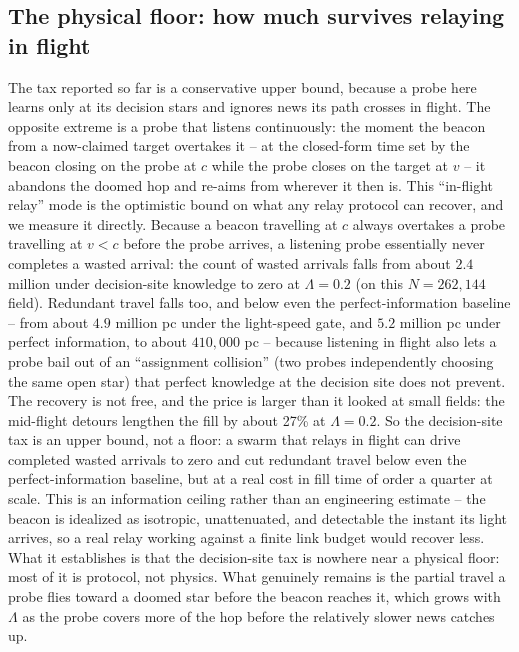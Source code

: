 \subsection{The physical floor: how much survives relaying in flight}
\label{sec:floor}
The tax reported so far is a conservative upper bound, because a probe here learns only at its
decision stars and ignores news its path crosses in flight. The opposite extreme is a probe that
listens continuously: the moment the beacon from a now-claimed target overtakes it -- at the
closed-form time set by the beacon closing on the probe at $c$ while the probe closes on the target
at $v$ -- it abandons the doomed hop and re-aims from wherever it then is. This ``in-flight relay''
mode is the optimistic bound on what any relay protocol can recover, and we measure it directly.
Because a beacon travelling at $c$ always overtakes a probe travelling at
$v < c$ before the probe arrives, a listening probe essentially never completes a wasted arrival:
the count of wasted arrivals falls from about $2.4$ million under decision-site knowledge to zero at
$\Lambda = 0.2$ (on this $N = 262{,}144$ field). Redundant travel falls too, and below even the
perfect-information baseline -- from about $4.9$ million pc under the light-speed gate, and $5.2$
million pc under perfect information, to about $410{,}000$ pc -- because listening in flight also lets a probe bail
out of an ``assignment collision'' (two probes independently choosing the same open star) that
perfect knowledge at the decision site does not prevent. The recovery is not free, and the price is
larger than it looked at small fields: the mid-flight detours lengthen the fill by about 27\% at
$\Lambda = 0.2$. So the decision-site tax is an upper bound, not a floor: a swarm that
relays in flight can drive completed wasted arrivals to zero and cut redundant travel below even the
perfect-information baseline, but at a real cost in fill time of order a quarter at scale. This is an information ceiling rather
than an engineering estimate -- the beacon is idealized as isotropic, unattenuated, and detectable
the instant its light arrives, so a real relay working against a finite link budget would recover
less. What it establishes is that the decision-site tax is nowhere near a physical floor: most of it
is protocol, not physics. What genuinely remains is the partial travel a probe flies toward a doomed
star before the beacon reaches it, which grows with $\Lambda$ as the probe covers more of the hop
before the relatively slower news catches up.

